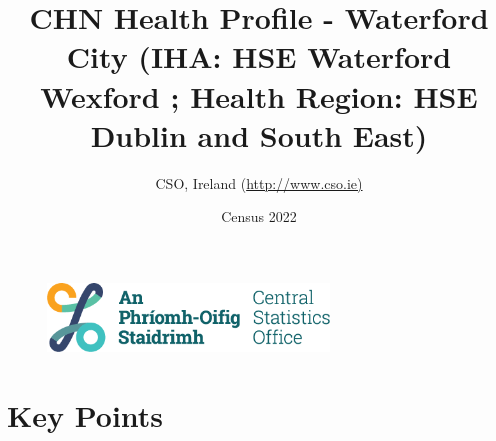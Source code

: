 \documentclass{article}
\title{CHN Health Profile - Waterford City (IHA: HSE Waterford Wexford ;  Health Region: HSE Dublin and South East) }
\date{Census 2022}
\author{CSO, Ireland  (\url{http://www.cso.ie)}}
\begin{document}


\begin{figure}
	\centering
\includegraphics[width =75mm]{../figures/CSO_Logo.png}
\end{figure}

				 
		   
						  
														  
																																													
												 
			 
\maketitle
					
													   
				 
						 
																																																																											   
				 
				  
  \pagebreak
    	    \tableofcontents

\pagebreak


\section{Key Points}
\end{document}

